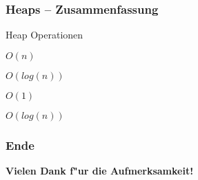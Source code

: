 \documentclass{beamer}
\begin{document}
\begin{frame}
\frametitle{Heaps -- Zusammenfassung}
\begin{block}{Heap Operationen}
\begin{description}
\item[BUILD-MAX-HEAP] $O(n)$
\item[INSERT] $O(log(n))$
\item[MAXIMUM] $O(1)$
\item[EXTRACT-MAXIMUM] $O(log(n))$
\end{description}
\end{block}
\end{frame}


\begin{frame}
\frametitle{Ende}
\begin{center}
\textbf{\Huge Vielen Dank f"ur die Aufmerksamkeit!}
\end{center}
\end{frame}
\end{document}
